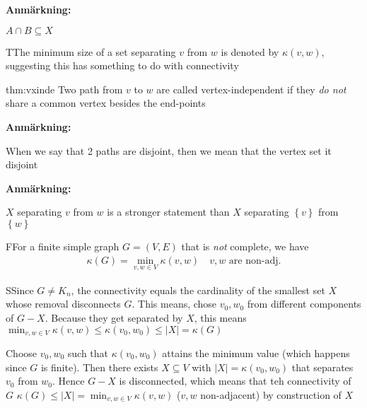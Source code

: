 \par\bigskip
\noindent\textbf{Anmärkning:}\par
\noindent $A\cap B\subseteq X$
\par\bigskip
\begin{theo}
  TThe minimum size of a set separating $v$ from $w$ is denoted by $\kappa(v,w)$, suggesting this has something to do with connectivity 
\end{theo}
\par\bigskip
\begin{theo}{thm:vxinde}
  Two path from $v$ to $w$ are called vertex-independent if they \textit{do not} share a common vertex besides the end-points
\end{theo}
\par\bigskip
\noindent\textbf{Anmärkning:}\par
\noindent When we say that 2 paths are disjoint, then we mean that the vertex set it disjoint
\par\bigskip
\noindent\textbf{Anmärkning:}\par
\noindent $X$ separating $v$ from $w$ is a stronger statement than $X$ separating $\left\{v\right\}$ from $\left\{w\right\}$
\par\bigskip
\begin{theo}
  FFor a finite simple graph $G = (V,E)$ that is \textit{not} complete, we have
  \begin{equation*}
    \begin{gathered}
      \kappa(G) = \min_{v,w\in V}\kappa(v,w)\quad\text{$v,w$ are non-adj.}
    \end{gathered}
  \end{equation*}
\end{theo}
\newpage
\begin{prf}
  SSince $G\neq K_n$, the connectivity equals the cardinality of the smallest set $X$ whose removal disconnects $G$. This means, chose $v_0,w_0$ from different components of $G-X$. Because they get separated by $X$, this means $\min_{v,w\in V}\kappa(v,w)\leq\kappa(v_0,w_0)\leq \left|X\right| = \kappa(G)$
  \par\bigskip
  \noindent Choose $v_0,w_0$ such that $\kappa(v_0,w_0)$ attains the minimum value (which happens since $G$ is finite). Then there exists $X\subseteq V$ with $\left|X\right| = \kappa(v_0,w_0)$ that separates $v_0$ from $w_0$. Hence $G-X$ is disconnected, which means that teh connectivity of $G$ $\kappa(G)\leq \left|X\right| = \min_{v,w\in V}\kappa(v,w)$ ($v,w$ non-adjacent) by construction of $X$
\end{prf}
